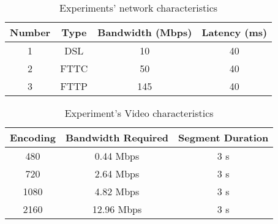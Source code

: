 \documentclass[10pt,sigconf]{acmart}
\begin{document}





\begin{table}[]
    \centering
    \begin{tabular}{c|c|c|c}
    \toprule
        Number & Type & Bandwidth (Mbps)  & Latency (ms)  \\
    \midrule
         1 & DSL  & 10  & 40 \\
    \midrule
         2 & FTTC & 50  & 40 \\
    \midrule
         3 & FTTP & 145 & 40 \\
    \bottomrule
    \end{tabular}
    \caption{Experiments' network characteristics}
    \label{tab:experiments-network}
\end{table}

\begin{table}[]
    \centering
    \begin{tabular}{c|c|c}
    \toprule
         Encoding & Bandwidth Required & Segment Duration \\
     \midrule
        480  & 0.44  Mbps & 3 s \\
        720  & 2.64  Mbps & 3 s \\
        1080 & 4.82  Mbps & 3 s \\
        2160 & 12.96 Mbps & 3 s \\

    \bottomrule
    \end{tabular}
    \caption{Experiment's Video characteristics}
    \label{tab:experiments-video}
\end{table}
\end{document}
